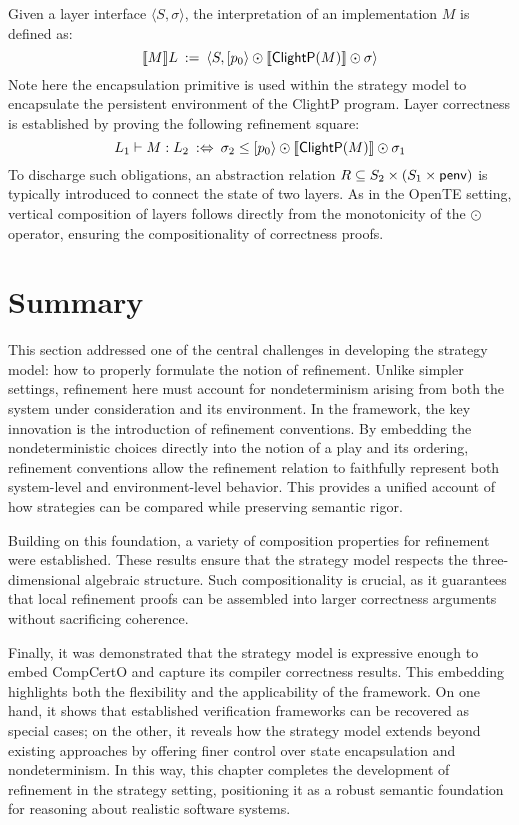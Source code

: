 Given a layer interface $\langle S, \sigma \rangle$,
the interpretation of an implementation $M$
is defined as:
\[
  \llbracket M \rrbracket L \::=\:
  \langle S, [ {p_0} \rangle \odot \llbracket  \mathsf{ClightP} (M) \rrbracket \odot \sigma \rangle
\]
Note here the encapsulation primitive
is used within the strategy model
to encapsulate the persistent environment
of the ClightP program.
Layer correctness is established by proving
the following refinement square:
\[
  L_1 \vdash M : L_2 \::\Leftrightarrow\:
  \sigma_2 \le [ {p_0} \rangle \odot \llbracket  \mathsf{ClightP} (M) \rrbracket \odot \sigma_1
\]
To discharge such obligations,
an abstraction relation $R \subseteq S_2 \times (S_1 \times  \mathsf{penv} )$
is typically introduced to connect the state of two layers.
As in the OpenTE setting,
vertical composition of layers follows
directly from the monotonicity of the $\odot$ operator,
ensuring the compositionality of correctness proofs.

\section{Summary}

This section addressed
one of the central challenges
in developing the strategy model:
how to properly formulate the notion of refinement.
Unlike simpler settings,
refinement here must account for
nondeterminism arising from both the system under consideration
and its environment.
In the framework, the key innovation
is the introduction of refinement conventions.
By embedding the nondeterministic choices
directly into the notion of a play and its ordering,
refinement conventions allow the refinement relation
to faithfully represent
both system-level and environment-level behavior.
This provides a unified account of
how strategies can be compared while preserving semantic rigor.

Building on this foundation,
a variety of composition properties
for refinement were established.
These results ensure
that the strategy model
respects the three-dimensional algebraic structure.
Such compositionality is crucial,
as it guarantees that local refinement proofs
can be assembled into larger correctness arguments
without sacrificing coherence.

Finally, it was demonstrated that
the strategy model is expressive enough to embed CompCertO
and capture its compiler correctness results.
This embedding highlights
both the flexibility and the applicability of the framework.
On one hand, it shows that established verification frameworks
can be recovered as special cases;
on the other, it reveals how the strategy model
extends beyond existing approaches
by offering finer control
over state encapsulation and nondeterminism.
In this way,
this chapter completes the development of refinement in the strategy setting,
positioning it as a robust semantic foundation
for reasoning about realistic software systems.
